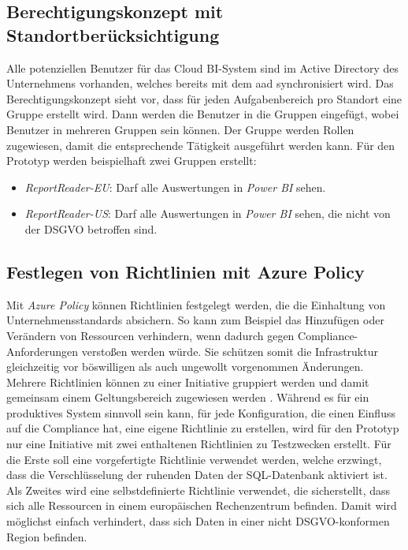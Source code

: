 \subsection{Berechtigungskonzept mit Standortberücksichtigung}
Alle potenziellen Benutzer für das Cloud BI-System sind im Active Directory des Unternehmens vorhanden, welches bereits mit dem \ac{aad} synchronisiert wird. Das Berechtigungskonzept sieht vor, dass für jeden Aufgabenbereich pro Standort eine Gruppe erstellt wird. Dann werden die Benutzer in die Gruppen eingefügt, wobei Benutzer in mehreren Gruppen sein können. Der Gruppe werden Rollen zugewiesen, damit die entsprechende Tätigkeit ausgeführt werden kann. Für den Prototyp werden beispielhaft zwei Gruppen erstellt:
\begin{itemize}
\item \textit{ReportReader-EU}: Darf alle Auswertungen in \textit{Power BI} sehen.
\item \textit{ReportReader-US}: Darf alle Auswertungen in \textit{Power BI} sehen, die nicht von der DSGVO betroffen sind.
\end{itemize}

\subsection{Festlegen von Richtlinien mit Azure Policy} \label{subsec:infra:prep:policy}
Mit \textit{Azure Policy} können Richtlinien festgelegt werden, die die Einhaltung von Unternehmensstandards absichern. So kann zum Beispiel das Hinzufügen oder Verändern von Ressourcen verhindern, wenn dadurch gegen Compliance-Anforderungen verstoßen werden würde. Sie schützen somit die Infrastruktur gleichzeitig vor böswilligen als auch ungewollt vorgenommen Änderungen. Mehrere Richtlinien können zu einer Initiative gruppiert werden und damit gemeinsam einem Geltungsbereich zugewiesen werden \cite{de_tender_azure_2019}. Während es für ein produktives System sinnvoll sein kann, für jede Konfiguration, die einen Einfluss auf die Compliance hat, eine eigene Richtlinie zu erstellen, wird für den Prototyp nur eine Initiative mit zwei enthaltenen Richtlinien zu Testzwecken erstellt. Für die Erste soll eine vorgefertigte Richtlinie verwendet werden, welche erzwingt, dass die Verschlüsselung der ruhenden Daten der SQL-Datenbank aktiviert ist. Als Zweites wird eine selbstdefinierte Richtlinie verwendet, die sicherstellt, dass sich alle Ressourcen in einem europäischen Rechenzentrum befinden. Damit wird möglichst einfach verhindert, dass sich Daten in einer nicht DSGVO-konformen Region befinden.

